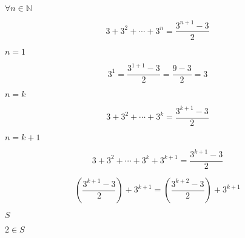 \documentclass[10pt]{book}
\begin{document}
\begin{mdSnippets}
\begin{mdInlineSnippet}[775ac455dd1f9db047b23c9a57b437ac]%
$ \forall n \in \mathbb{N} $\end{mdInlineSnippet}%
\begin{mdDisplaySnippet}[7cd1e16d1f92476019233df7311bce8b]%
\[%
3 + 3^2 + \cdots + 3^n = \frac {3^{n+1} - 3} {2}
\]%
\end{mdDisplaySnippet}%
\begin{mdInlineSnippet}[ab78ccfbcd04b1ba22eb9427251cb20d]%
$n = 1$\end{mdInlineSnippet}%
\begin{mdDisplaySnippet}[a1f851db0ec848fc4d0e5a373cb2d682]%
\[%
3^1 = \frac {3^{1+1}-3} {2} = \frac {9-3} {2} = 3
\]%
\end{mdDisplaySnippet}%
\begin{mdInlineSnippet}[dc36071f824776cfcf54b119f4c1a163]%
$n = k$\end{mdInlineSnippet}%
\begin{mdDisplaySnippet}[e7a77b54672660e11e99338cf9752f92]%
\[%
3 + 3^2 + \cdots + 3^k = \frac {3^{k+1} - 3} {2}
\]%
\end{mdDisplaySnippet}%
\begin{mdInlineSnippet}[6db118b1df7f9211c7324569b51daf21]%
$n = k+1$\end{mdInlineSnippet}%
\begin{mdDisplaySnippet}%
\[%
3 + 3^2 + \cdots + 3^k + 3^{k+1}= \frac {3^{k+1} - 3} {2} 
\]%
\end{mdDisplaySnippet}%
\begin{mdDisplaySnippet}[adc86814b171b8a90c905a68892162f0]%
\[%
(\frac {3^{k+1} - 3} {2}) + 3^{k+1} = (\frac {3^{k+2}-3} {2}) + 3^{k+1} 
\]%
\end{mdDisplaySnippet}%
\begin{mdInlineSnippet}%
$S$\end{mdInlineSnippet}%
\begin{mdInlineSnippet}[51d4eb24437f415da2634ea4b8eb9113]%
$2 \in S$\end{mdInlineSnippet}%

\end{mdSnippets}
\end{document}
